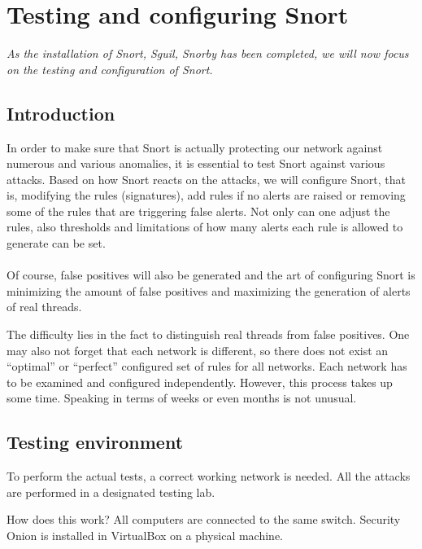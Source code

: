 \chapter{Testing and configuring Snort}
\minitoc
\emph{As the installation of Snort, Sguil, Snorby has been completed, we will now focus on the testing and configuration of Snort.}

\section{Introduction}

In order to make sure that Snort is actually protecting our network against numerous and various anomalies, it is essential to test Snort against various attacks. Based on how Snort reacts on the attacks, we will configure Snort, that is, modifying the rules (signatures), add rules if no alerts are raised or removing some of the rules that are triggering false alerts. Not only can one adjust the rules, also thresholds and limitations of how many alerts each rule is allowed to generate can be set. \\ \\
Of course, false positives will also be generated and the art of configuring Snort is minimizing the amount of false positives and maximizing the generation of alerts of real threads.

The difficulty lies in the fact to distinguish real threads from false positives. One may also not forget that each network is different, so there does not exist an ``optimal'' or ``perfect'' configured set of rules for all networks. Each network has to be examined and configured independently. However, this process takes up some time. Speaking in terms of weeks or even months is not unusual.

\section{Testing environment}

To perform the actual tests, a correct working network is needed. All the attacks are performed in a designated testing lab.

How does this work? All computers are connected to the same switch. Security Onion is installed in VirtualBox on a physical machine. 

